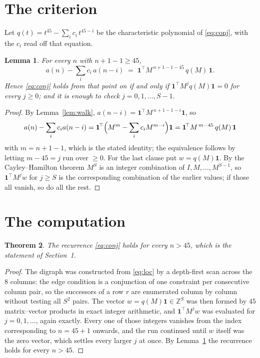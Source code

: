 \documentclass[11pt,a4paper]{article}
\theoremstyle{plain}
\newtheorem{theorem}{Theorem}
\newtheorem{lemma}[theorem]{Lemma}
\theoremstyle{definition}
\begin{document}
\section{The criterion}

Let $q(t)=t^{45}-\sum_i c_i\,t^{45-i}$ be the characteristic polynomial of
\eqref{eq:conj}, with the $c_i$ read off that equation.

\begin{lemma}\label{lem:crit}
For every $n$ with $n+1-1\ge45$,
\[
a(n)-\sum_i c_i\,a(n-i)\;=\;\mathbf{1}^{\!\top}M^{\,n+1-1-45}\,q(M)\,\mathbf{1} .
\]
Hence \eqref{eq:conj} holds from that point on if and only if
$\mathbf{1}^{\!\top}M^{j}q(M)\mathbf{1}=0$ for every $j\ge0$; and it is enough to check
$j=0,1,\dots,S-1$.
\end{lemma}

\begin{proof}
By Lemma~\ref{lem:walk}, $a(n-i)=\mathbf{1}^{\!\top}M^{\,n+1-1-i}\mathbf{1}$, so
\[
a(n)-\sum_i c_i a(n-i)
=\mathbf{1}^{\!\top}\Bigl(M^{m}-\sum_i c_i M^{m-i}\Bigr)\mathbf{1}
=\mathbf{1}^{\!\top}M^{\,m-45}\,q(M)\,\mathbf{1}
\]
with $m=n+1-1$, which is the stated identity; the equivalence follows by letting
$m-45=j$ run over $\ge0$. For the last clause put $w=q(M)\mathbf{1}$. By the
Cayley--Hamilton theorem $M^{S}$ is an integer combination of $I,M,\dots,M^{S-1}$, so
$\mathbf{1}^{\!\top}M^{j}w$ for $j\ge S$ is the corresponding combination of the earlier
values; if those all vanish, so do all the rest.
\end{proof}

\section{The computation}

\begin{theorem}
The recurrence \eqref{eq:conj} holds for every $n>45$, which is the statement of
Section~1.
\end{theorem}

\begin{proof}
The digraph was constructed from \eqref{eq:loc} by a depth-first scan across the $8$
columns: the edge condition is a conjunction of one constraint per consecutive column
pair, so the successors of a row $r$ are enumerated column by column without testing all
$S^2$ pairs. The vector $w=q(M)\mathbf{1}\in\mathbb{Z}^{S}$ was then formed by $45$
matrix--vector products in exact integer arithmetic, and $\mathbf{1}^{\!\top}M^{j}w$ was
evaluated for $j=0,1,\dots$, again exactly. Every one of those integers vanishes from the
index corresponding to $n=45+1$ onwards, and the run continued until $w$ itself was the
zero vector, which settles every larger $j$ at once. By Lemma~\ref{lem:crit} the recurrence
holds for every $n>45$.
\end{proof}
\end{document}
